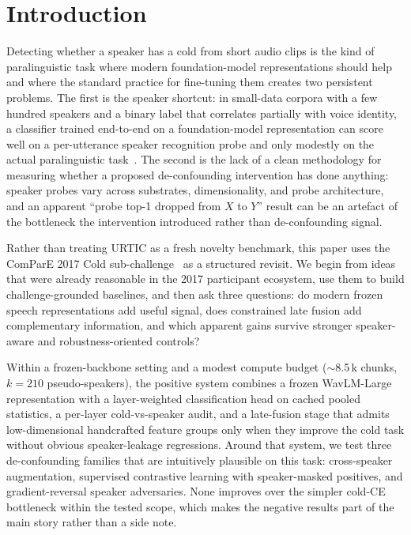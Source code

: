 \section{Introduction}
\label{sec:intro}

Detecting whether a speaker has a cold from short audio clips is the kind of paralinguistic task where modern foundation-model representations should help and where the standard practice for fine-tuning them creates two persistent problems. The first is the speaker shortcut: in small-data corpora with a few hundred speakers and a binary label that correlates partially with voice identity, a classifier trained end-to-end on a foundation-model representation can score well on a per-utterance speaker recognition probe and only modestly on the actual paralinguistic task~\cite{huckvale2017cold,schuller2017interspeech}. The second is the lack of a clean methodology for measuring whether a proposed de-confounding intervention has done anything: speaker probes vary across substrates, dimensionality, and probe architecture, and an apparent ``probe top-1 dropped from $X$ to $Y$'' result can be an artefact of the bottleneck the intervention introduced rather than de-confounding signal.

Rather than treating URTIC as a fresh novelty benchmark, this paper uses the ComParE 2017 Cold sub-challenge~\cite{schuller2017interspeech} as a structured revisit. We begin from ideas that were already reasonable in the 2017 participant ecosystem, use them to build challenge-grounded baselines, and then ask three questions: do modern frozen speech representations add useful signal, does constrained late fusion add complementary information, and which apparent gains survive stronger speaker-aware and robustness-oriented controls?

Within a frozen-backbone setting and a modest compute budget ($\sim$8.5\,k chunks, $k{=}210$ pseudo-speakers), the positive system combines a frozen WavLM-Large~\cite{chen2022wavlm} representation with a layer-weighted classification head on cached pooled statistics, a per-layer cold-vs-speaker audit, and a late-fusion stage that admits low-dimensional handcrafted feature groups only when they improve the cold task without obvious speaker-leakage regressions. Around that system, we test three de-confounding families that are intuitively plausible on this task: cross-speaker augmentation, supervised contrastive learning with speaker-masked positives, and gradient-reversal speaker adversaries. None improves over the simpler cold-CE bottleneck within the tested scope, which makes the negative results part of the main story rather than a side note.

